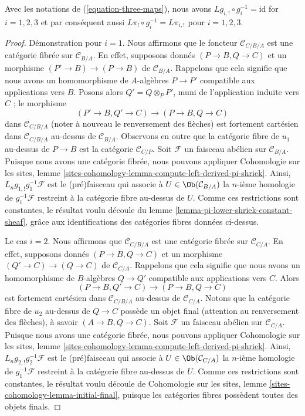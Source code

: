 \begin{lemma}
\label{lemma-triangle-compute-lower-shriek}
Avec les notations de (\ref{equation-three-maps}), nous avons
$Lg_{i, !} \circ g_i^{-1} = \text{id}$ for $i = 1, 2, 3$
et par conséquent aussi $L\pi_! \circ g_i^{-1} = L\pi_{i, !}$ pour
$i = 1, 2, 3$.
\end{lemma}

\begin{proof}
Démonstration pour $i = 1$. Nous affirmons que le foncteur
$\mathcal{C}_{C/B/A}$ est une catégorie fibrée sur $\mathcal{C}_{B/A}$.
En effet, supposons donnés $(P \to B, Q \to C)$ et un morphisme
$(P' \to B) \to (P \to B)$ de $\mathcal{C}_{B/A}$. Rappelons que cela
signifie que nous avons un homomorphisme de $A$-algèbres $P \to P'$
compatible aux applications vers $B$. Posons alors $Q' = Q \otimes_P P'$,
muni de l'application induite vers $C$ ; le morphisme
$$
(P' \to B, Q' \to C) \longrightarrow (P \to B, Q \to C)
$$
dans $\mathcal{C}_{C/B/A}$ (noter à nouveau le renversement des flèches)
est fortement cartésien dans $\mathcal{C}_{C/B/A}$ au-dessus de
$\mathcal{C}_{B/A}$. Observons en outre que la catégorie fibre de $u_1$
au-dessus de $P \to B$ est la catégorie $\mathcal{C}_{C/P}$. Soit
$\mathcal{F}$ un faisceau abélien sur $\mathcal{C}_{B/A}$. Puisque nous
avons une catégorie fibrée, nous pouvons appliquer Cohomologie sur les sites,
lemme \ref{sites-cohomology-lemma-compute-left-derived-pi-shriek}. Ainsi,
$L_ng_{1, !}g_1^{-1}\mathcal{F}$ est le (pré)faisceau qui associe à
$U \in \Ob(\mathcal{C}_{B/A})$ la $n$-ième homologie de
$g_1^{-1}\mathcal{F}$ restreint à la catégorie fibre au-dessus de $U$.
Comme ces restrictions sont constantes, le résultat voulu découle du lemme
\ref{lemma-pi-lower-shriek-constant-sheaf}, grâce aux identifications des
catégories fibres données ci-dessus.

\medskip\noindent
Le cas $i = 2$. Nous affirmons que $\mathcal{C}_{C/B/A}$ est une catégorie
fibrée sur $\mathcal{C}_{C/A}$. En effet, supposons donnés
$(P \to B, Q \to C)$ et un morphisme $(Q' \to C) \to (Q \to C)$ de
$\mathcal{C}_{C/A}$. Rappelons que cela signifie que nous avons un
homomorphisme de $B$-algèbres $Q \to Q'$ compatible aux applications vers
$C$. Alors
$$
(P \to B, Q' \to C) \longrightarrow (P \to B, Q \to C)
$$
est fortement cartésien dans $\mathcal{C}_{C/B/A}$ au-dessus de
$\mathcal{C}_{C/A}$. Notons que la catégorie fibre de $u_2$ au-dessus de
$Q \to C$ possède un objet final (attention au renversement des flèches),
à savoir $(A \to B, Q \to C)$. Soit $\mathcal{F}$ un faisceau abélien sur
$\mathcal{C}_{C/A}$. Puisque nous avons une catégorie fibrée, nous pouvons
appliquer Cohomologie sur les sites, lemme
\ref{sites-cohomology-lemma-compute-left-derived-pi-shriek}. Ainsi,
$L_ng_{2, !}g_2^{-1}\mathcal{F}$ est le (pré)faisceau qui associe à
$U \in \Ob(\mathcal{C}_{C/A})$ la $n$-ième homologie de
$g_1^{-1}\mathcal{F}$ restreint à la catégorie fibre au-dessus de $U$.
Comme ces restrictions sont constantes, le résultat voulu découle de
Cohomologie sur les sites, lemme
\ref{sites-cohomology-lemma-initial-final}, puisque les catégories fibres
possèdent toutes des objets finals.


\end{proof}
